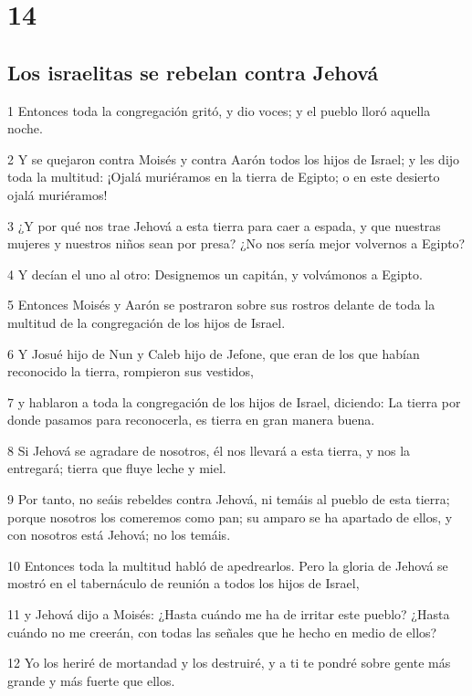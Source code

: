 \chapter{14}

\section*{Los israelitas se rebelan contra Jehová}

\par 1 Entonces toda la congregación gritó, y dio voces; y el pueblo lloró aquella noche.
\par 2 Y se quejaron contra Moisés y contra Aarón todos los hijos de Israel; y les dijo toda la multitud: ¡Ojalá muriéramos en la tierra de Egipto; o en este desierto ojalá muriéramos!
\par 3 ¿Y por qué nos trae Jehová a esta tierra para caer a espada, y que nuestras mujeres y nuestros niños sean por presa? ¿No nos sería mejor volvernos a Egipto?
\par 4 Y decían el uno al otro: Designemos un capitán, y volvámonos a Egipto.
\par 5 Entonces Moisés y Aarón se postraron sobre sus rostros delante de toda la multitud de la congregación de los hijos de Israel.
\par 6 Y Josué hijo de Nun y Caleb hijo de Jefone, que eran de los que habían reconocido la tierra, rompieron sus vestidos,
\par 7 y hablaron a toda la congregación de los hijos de Israel, diciendo: La tierra por donde pasamos para reconocerla, es tierra en gran manera buena.
\par 8 Si Jehová se agradare de nosotros, él nos llevará a esta tierra, y nos la entregará; tierra que fluye leche y miel.
\par 9 Por tanto, no seáis rebeldes contra Jehová, ni temáis al pueblo de esta tierra; porque nosotros los comeremos como pan; su amparo se ha apartado de ellos, y con nosotros está Jehová; no los temáis.
\par 10 Entonces toda la multitud habló de apedrearlos. Pero la gloria de Jehová se mostró en el tabernáculo de reunión a todos los hijos de Israel,
\par 11 y Jehová dijo a Moisés: ¿Hasta cuándo me ha de irritar este pueblo? ¿Hasta cuándo no me creerán, con todas las señales que he hecho en medio de ellos?
\par 12 Yo los heriré de mortandad y los destruiré, y a ti te pondré sobre gente más grande y más fuerte que ellos.
